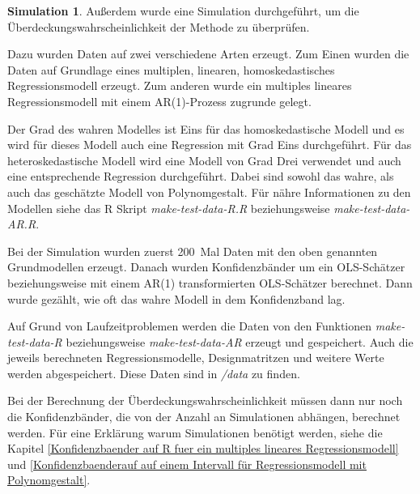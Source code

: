 \documentclass[12pt,a4paper]{article}
\theoremstyle{definition}
\theoremstyle{definition}
\theoremstyle{definition}
\newtheorem{Simulation}[Definition]{Simulation}
\theoremstyle{definition}
\newcommand{\ntest}{200}
\begin{document}
\begin{Simulation}
Außerdem wurde eine Simulation durchgeführt, um die Überdeckungswahrscheinlichkeit der Methode zu überprüfen.

Dazu wurden Daten auf zwei verschiedene Arten erzeugt. Zum Einen wurden die Daten auf Grundlage eines  multiplen, linearen, homoskedastisches Regressionsmodell erzeugt. Zum anderen wurde ein multiples lineares Regressionsmodell mit einem AR(1)-Prozess zugrunde gelegt. 

Der Grad des wahren Modelles ist Eins für das homoskedastische Modell und es wird für dieses Modell auch eine Regression mit Grad Eins durchgeführt. Für das heteroskedastische Modell wird eine Modell von Grad Drei verwendet und auch eine entsprechende Regression durchgeführt. Dabei sind sowohl das wahre, als auch das geschätzte Modell von Polynomgestalt. Für nähre Informationen zu den Modellen siehe das R Skript \textit{make-test-data-R.R} beziehungsweise \textit{make-test-data-AR.R}.

Bei der Simulation wurden zuerst \ntest ~Mal Daten mit den oben genannten Grundmodellen erzeugt. Danach wurden Konfidenzbänder um ein OLS-Schätzer beziehungsweise mit einem AR(1) transformierten OLS-Schätzer berechnet. Dann wurde gezählt, wie oft das wahre Modell in dem Konfidenzband lag. 


Auf Grund von Laufzeitproblemen werden die Daten von den Funktionen \textit{make-test-data-R} beziehungsweise \textit{make-test-data-AR} erzeugt und gespeichert. Auch die jeweils berechneten Regressionsmodelle, Designmatritzen und weitere Werte werden abgespeichert. Diese Daten sind in \textit{/data} zu finden.

Bei der Berechnung der Überdeckungswahrscheinlichkeit müssen dann nur noch die Konfidenzbänder, die von der Anzahl an Simulationen abhängen, berechnet werden. Für eine Erklärung warum Simulationen benötigt werden, siehe die Kapitel \ref{Konfidenzbaender auf R fuer ein multiples lineares Regressionsmodell} und \ref{Konfidenzbaenderauf auf einem Intervall für Regressionsmodell mit Polynomgestalt}.



\end{Simulation}
\end{document}
